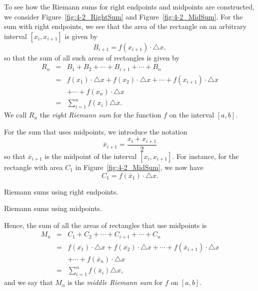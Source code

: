 To see how the Riemann sums for right endpoints and midpoints are constructed, we consider Figure~\ref{fig:4-2_RightSum} and Figure~\ref{fig:4-2_MidSum}. For the sum with right endpoints, we see that the area of the rectangle on an arbitrary interval $[x_i, x_{i+1}]$ is given by
\[ B_{i+1} = f(x_{i+1}) \cdot \triangle x, \]
so that the sum of all such areas of rectangles is given by
\begin{eqnarray*}
R_n & = & B_1 + B_2 + \cdots + B_{i+1} + \cdots + B_n \\
& = &  f(x_1) \cdot \triangle x + f(x_2) \cdot \triangle x + \cdots + f(x_{i+1}) \cdot \triangle x \\
& & + \cdots + f(x_{n}) \cdot \triangle x \\ 
& = & \sum_{i=1}^{n} f(x_i) \triangle x.
\end{eqnarray*}
We call $R_n$ the \emph{right Riemann sum}  for the function $f$ on the interval $[a,b]$.  

For the sum that uses midpoints, we introduce the notation
\[ \overline{x}_{i+1} = \frac{x_{i} + x_{i+1}}{2} \]
so that $\overline{x}_{i+1}$ is the midpoint of the interval $[x_i, x_{i+1}]$.  For instance, for the rectangle with area $C_1$ in Figure~\ref{fig:4-2_MidSum}, we now have
\[ C_1 = f(\overline{x}_1) \cdot \triangle x. \]

\begin{marginfigure}[-7cm] %
\caption{Riemann sums using right endpoints.} \label{fig:4-2_RightSum}
\end{marginfigure}

\begin{marginfigure} %
\caption{Riemann sums using midpoints.} \label{fig:4-2_MidSum}
\end{marginfigure}

Hence, the sum of all the areas of rectangles that use midpoints is 
\begin{eqnarray*}
M_n & = & C_1 + C_2 + \cdots + C_{i+1} + \cdots + C_n \\
& = &  f(\overline{x_1}) \cdot \triangle x + f(\overline{x_2}) \cdot \triangle x + \cdots + f(\overline{x}_{i+1}) \cdot \triangle x \\
& & + \cdots + f(\overline{x}_{n}) \cdot \triangle x \\ 
& = & \sum_{i=1}^{n} f(\overline{x}_i) \triangle x,
\end{eqnarray*}
and we say that $M_n$ is the \emph{middle Riemann sum}  for $f$ on $[a,b]$.

